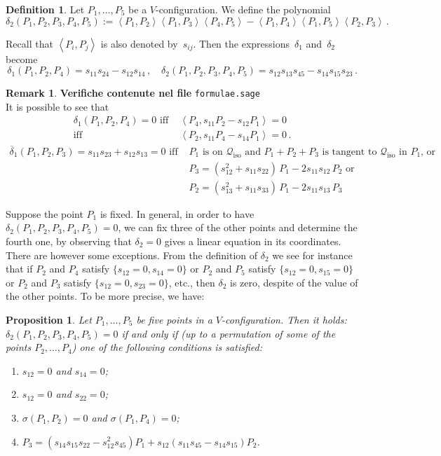 \documentclass{amsart}
\theoremstyle{plain}
\newtheorem{prop}[lemma]{Proposition}
\theoremstyle{definition}
\newtheorem{definition}[lemma]{Definition}
\newtheorem{rmk}[lemma]{Remark}
\newcommand{\iso}{\mathcal{Q}_{\mathrm{iso}}}
\newcommand{\scl}[2]{\left\langle {#1}, {#2} \right\rangle}
\begin{document}
\begin{definition}
Let $P_1, \dots, P_5$ be a $V$-configuration.
We define the polynomial
%
\[
  \delta_2(P_1, P_2, P_3, P_4, P_5) :=
  \scl{P_1}{P_2} \scl{P_1}{P_3} \scl{P_4}{P_5} -
  \scl{P_1}{P_4} \scl{P_1}{P_5} \scl{P_2}{P_3} \,.
\]
%
\end{definition}

Recall that $\scl{P_i}{P_j}$ is also denoted by~$s_{ij}$.
Then the expressions~$\delta_1$ and~$\delta_2$ become
%
\[
  \delta_1(P_1, P_2, P_4) = s_{11} s_{24}-s_{12}s_{14} \,, \quad
  \delta_2(P_1, P_2, P_3, P_4, P_5) = s_{12}s_{13}s_{45}-s_{14}s_{15} s_{23} \,.
\]
%
\begin{rmk}
\label{rmk:characteristics_d1_d2}
\textbf{Verifiche contenute nel file} \verb+formulae.sage+ \\
It is possible to see that
%
\begin{align}
\label{rmk_delta_case1}
  \delta_1(P_1, P_2, P_4) = 0 \mbox{ iff } &\scl{P_4}{s_{11}P_2-s_{12}P_1} = 0\\
  \mbox{iff } &\scl{P_2}{s_{11}P_4-s_{14}P_1} = 0 \,. \nonumber
\end{align}
%
\begin{align}
\label{rmk_delta_case2}
  \overline{\delta}_1(P_1, P_2, P_3) = s_{11} s_{23}+s_{12}s_{13} =0 \mbox{ iff } &
  P_1 \mbox{ is on~$\iso$ and } P_1 + P_2 + P_3 \mbox{ is tangent to~$\iso$ in $P_1$, or} \\
  & P_3 = (s_{12}^2+s_{11}s_{22}) \, P_1 - 2s_{11}s_{12} \, P_2 \mbox{ or} \nonumber \\
  & P_2 = (s_{13}^2+s_{11}s_{33}) \, P_1 - 2s_{11}s_{13} \, P_3 \nonumber
\end{align}
%
\end{rmk}
Suppose the point $P_1$ is fixed. In general, in order to have
$\delta_2(P_1, P_2, P_3, P_4, P_5) = 0$, we can fix three of the other points
and determine the fourth one, by observing
that $\delta_2=0$ gives a linear equation in its coordinates. There are
however
some exceptions. From the definition of $\delta_2$ we see for instance that
if $P_2$ and $P_4$ satisfy $\{s_{12}=0, s_{14}=0\}$ or $P_2$ and
$P_5$ satisfy $\{s_{12}=0, s_{15}=0\}$ or $P_2$ and $P_3$ satisfy
$\{s_{12}=0, s_{23}=0\}$, etc., then $\delta_2$ is zero,
despite of the value of the other points. To be more precise, we have:
%
\begin{prop}
\label{prop:definitionP3}
Let $P_1, \dots, P_5$ be five points in a $V$-configuration. Then it holds:
$\delta_2(P_1, P_2, P_3, P_4, P_5) = 0$ if and only if (up to a permutation
of some of the points $P_2, \dots, P_4$) one of the following conditions
is satisfied:
%
\begin{enumerate}
  \item $s_{12} = 0$ and $s_{14} = 0$;
  \label{defP3_1}
  \item $s_{12} = 0$ and $s_{22} = 0$;
  \label{defP3_2}
  \item $\sigma(P_1, P_2) = 0$ and $\sigma(P_1, P_4) = 0$;
  \label{defP3_3}
  \item $P_3 = (s_{14}s_{15}s_{22}-s_{12}^2s_{45})P_1  +s_{12}(s_{11}s_{45}-s_{14}s_{15})P_2$.
  \label{defP3_4}
\end{enumerate}
%
\end{prop}
\end{document}
